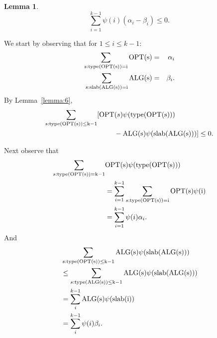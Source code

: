 \documentclass[conference]{IEEEtran}
\newtheorem{lemma}{Lemma}
\def \OPT {\rm{OPT}}
\def \ALG {\rm{ALG}}
\def \slab {\rm{slab}}
\def \type {\rm{type}}
\begin{document}
  \begin{lemma}
    \begin{equation*}
      \sum_{i=1}^{k-1}\psi(i)(\alpha_i-\beta_i)\leq 0.
    \end{equation*}
  \end{lemma}
  \begin{IEEEproof}
    We start by observing that for $1\leq i\leq k-1$:
    \begin{eqnarray*}
      \sum_{s:\type(\OPT(s))=i}\OPT(s)&=&\alpha_i\\
      \sum_{s:\slab(\ALG(s))=i}\ALG(s)&=&\beta_i.
    \end{eqnarray*}
    By Lemma~\ref{lemma:6},
    \begin{equation*}
    \begin{split}
      \sum_{s:\type(\OPT(s))\leq k-1}[\OPT&(s)\psi(\type(\OPT(s)))\\
      &-\ALG(s)\psi(\slab(\ALG(s)))]\leq0.
    \end{split}
    \end{equation*}

    Next observe that
    \begin{equation*}
      \begin{split}
      \sum_{s:\type(\OPT(s))=k-1}&\OPT(s)\psi(\type(\OPT(s)))\\
      &=\sum_{i=1}^{k-1}\sum_{s:\type(\OPT(s))=i}\OPT(s)\psi(i)\\
      &=\sum_{i=1}^{k-1}\psi(i)\alpha_i.\\
      \end{split}
    \end{equation*}
    And
    \begin{equation*}
      \begin{split}
      &\sum_{s:\type(\OPT(s))\leq k-1}\ALG(s)\psi(\slab(\ALG(s)))\\
      &\leq\sum_{s:\type(\ALG(s))\leq k-1}\ALG(s)\psi(\slab(\ALG(s)))\\
      &=\sum_{i}^{k-1} \ALG(s)\psi(\slab(i))\\
      &=\sum_{i}^{k-1}\psi(i)\beta_i.
      \end{split}
    \end{equation*}
  \end{IEEEproof}
\end{document}
